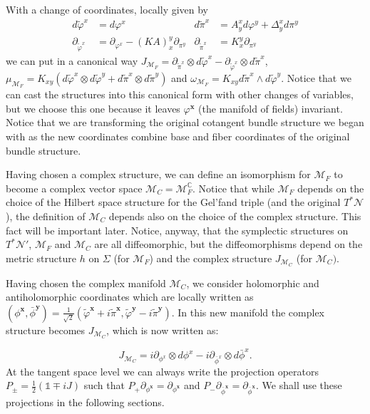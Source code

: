 \documentclass[12pt]{article}%
\begin{document}
With a change of coordinates, locally given by
\begin{align}
\label{eq:changeOfCoordinates}
d{\tilde{\varphi}^x}&=d{\varphi^x} &
d{\tilde{\pi}^x}&=A^x_yd{\varphi^y}+\Delta^x_yd{\pi^y} 
\\
\partial_{\tilde{\varphi}^x}&=\partial_{\varphi^x}- (K A)^y_x\partial_{\pi^y} &
\partial_{\tilde{\pi}^x}&=K^y_x\partial_{{\pi}^y}
\end{align}
 we can put in a canonical way $J_{\mathcal{M}_F}=\partial_{\tilde{\pi}^x}\otimes d\tilde{\varphi}^x-\partial_{\tilde{\varphi}^x}\otimes d\tilde{\pi}^x$, $\mu_{\mathcal{M}_F}=K_{xy}(d\tilde{\varphi}^x\otimes d\tilde{\varphi}^y+d\tilde{\pi}^x\otimes d\tilde{\pi}^y)$ and $\omega_{\mathcal{M}_F}=K_{xy} d\tilde{\pi}^x\wedge d\tilde{\varphi}^y$. Notice that we can cast the structures into this canonical form with other changes of variables, but we choose this one because it leaves $\varphi^\mathbf{x}$ (the manifold of fields) invariant. Notice that we are transforming the original cotangent bundle structure we began with as the new coordinates combine base and fiber coordinates of the original bundle structure.

Having chosen a complex structure, we can define an isomorphism for $\mathcal{M}_F$ to become a complex vector space $\mathcal{M}_C=\mathcal{M}_F^{\mathbb{C}}$. Notice that while $\mathcal{M}_F$ depends on the choice of the Hilbert space structure for the Gel'fand triple (and the original $T^*\mathcal{N}$), the definition of $\mathcal{M}_C$ depends also on the choice of the complex structure.  This fact will be important later. Notice, anyway, that the symplectic structures on $T^*\mathcal{N}'$, $\mathcal{M}_F$ and $\mathcal{M}_C$ are all diffeomorphic, but the diffeomorphisms depend on the metric structure $h$ on $\Sigma$ (for $\mathcal{M}_F$)  and the complex structure $J_{\mathcal{M}_C}$ (for $\mathcal{M}_C)$. 

 Having chosen the complex manifold $\mathcal{M}_C$, we consider holomorphic and antiholomorphic  coordinates which are locally written as $(\phi^{\mathbf{x}},\bar{\phi}^{\mathbf{y}})=\frac{1}{\sqrt{2}}(\tilde{\varphi}^{\mathbf{x}}+i\tilde{\pi}^{\mathbf{x}},\tilde{\varphi}^{\mathbf{y}}-i\tilde{\pi}^{\mathbf{y}})$. In this new manifold the complex structure becomes  $J_{\mathcal{M}_C}$, which  is now written as: 

\begin{equation}
\label{eq:complexholom}
J_{\mathcal{M}_C}=i \partial_{\phi^x}\otimes d\phi^x-i \partial_{\bar{\phi}^x}\otimes d\bar{\phi}^x.
\end{equation}
At the tangent space level we can always write the projection operators $P_{\pm}=\frac12(\mathds{1}\mp iJ)$ such that $P_{+}\partial_{\phi^{\mathbf{x}}}=\partial_{\phi^{\mathbf{x}}}$ and $P_{-}\partial_{\bar\phi^{\mathbf{x}}}=\partial_{\bar\phi^{\mathbf{x}}}$. We shall use these projections in the following sections.
\end{document}
